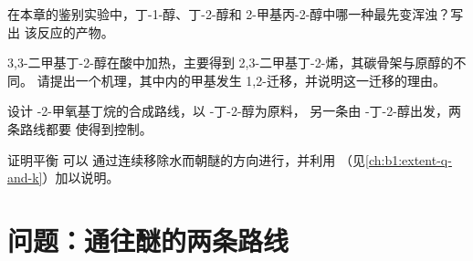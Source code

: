 \begin{exercise}[$\star\star$]\label{exo:b1:alcohol-activation:9}
在本章的鉴别实验中，丁-1-醇、丁-2-醇和
2-甲基丙-2-醇中哪一种最先变浑浊？写出
该反应的产物。
\end{exercise}

\begin{exercise}[$\star\star\star$]\label{exo:b1:alcohol-activation:10}
3,3-二甲基丁-2-醇在酸中加热，主要得到
2,3-二甲基丁-2-烯，其碳骨架与原醇的不同。
请提出一个机理，其中内的甲基发生
1,2-迁移，并说明这一迁移的理由。
\end{exercise}

\begin{exercise}[$\star\star\star$]\label{exo:b1:alcohol-activation:11}
设计 -2-甲氧基丁烷的合成路线，以 -丁-2-醇为原料，
另一条由 -丁-2-醇出发，两条路线都要
使得到控制。
\end{exercise}

\begin{exercise}[$\star\star\star$]\label{exo:b1:alcohol-activation:12}
证明平衡  可以
通过连续移除水而朝醚的方向进行，并利用
（见\cref{ch:b1:extent-q-and-k}）加以说明。
\end{exercise}

\section{问题：通往醚的两条路线}

